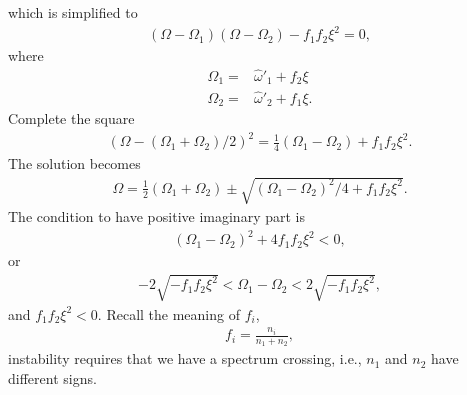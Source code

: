 \documentclass[letterpaper,12pt,english]{sphinxmanual}
\begin{document}
which is simplified to
\begin{equation*}
\begin{split}(\Omega-\Omega_1)(\Omega-\Omega_2) -f_1f_2\xi^2 = 0,\end{split}
\end{equation*}
where
\begin{equation*}
\begin{split}\Omega_1 = & \hat\omega'_1 + f_2 \xi\\
\Omega_2 = & \hat\omega'_2 + f_1 \xi.\end{split}
\end{equation*}
Complete the square
\begin{equation*}
\begin{split}(\Omega - (\Omega_1 + \Omega_2)/2)^2 = \frac{1}{4}(\Omega_1-\Omega_2) + f_1f_2\xi^2.\end{split}
\end{equation*}
The solution becomes
\begin{equation*}
\begin{split}\Omega = \frac{1}{2}(\Omega_1+\Omega_2)\pm\sqrt{ (\Omega_1-\Omega_2)^2/4 + f_1f_2\xi^2 }.\end{split}
\end{equation*}
The condition to have positive imaginary part is
\begin{equation*}
\begin{split}(\Omega_1-\Omega_2)^2 + 4f_1f_2\xi^2 < 0,\end{split}
\end{equation*}
or
\begin{equation*}
\begin{split}-2\sqrt{-f_1f_2\xi^2}<\Omega_1-\Omega_2<2\sqrt{-f_1f_2\xi^2},\end{split}
\end{equation*}
and \(f_1f_2\xi^2<0\). Recall the meaning of \(f_i\),
\begin{equation*}
\begin{split}f_i = \frac{n_i}{n_1+n_2},\end{split}
\end{equation*}
instability requires that we have a spectrum crossing, i.e., \(n_1\) and \(n_2\) have different signs.
\end{document}
